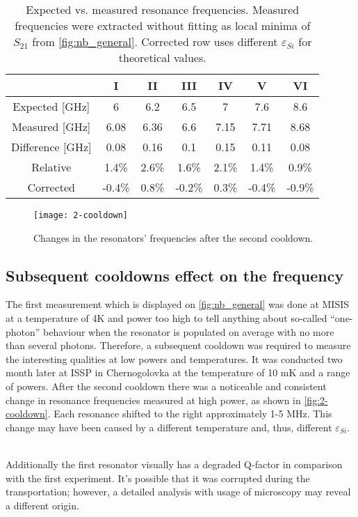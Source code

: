 \documentclass[12pt]{article}
\numberwithin{equation}{section}
\numberwithin{figure}{section}
\begin{document}
\begin{table}
\centering
\bgroup
\def\arraystretch{1.5}%
\begin{tabular}{c|*{6}{c}}
  & I & II & III & IV & V & VI\\
\hline
Expected [GHz]& 6 & 6.2 & 6.5 & 7 & 7.6 & 8.6 \\
Measured [GHz] & 6.08 &  6.36 &  6.6  &  7.15 &  7.71 &  8.68 \\
Difference [GHz]&  0.08 &  0.16 &  0.1  &  0.15 &  0.11 &  0.08 \\
Relative & 1.4\% &  2.6\% &  1.6\% &  2.1\% &  1.4\% &  0.9\% \\
Corrected & -0.4\% &  0.8\% & -0.2\% &  0.3\% & -0.4\% & -0.9\%
\end{tabular}
\egroup
\caption{Expected vs. measured resonance frequencies. Measured frequencies were extracted without fitting as local minima of $S_{21}$ from \autoref{fig:nb_general}. Corrected row uses different $\varepsilon_{Si}$ for theoretical values.}
\label{tab:freqs_nb}
\end{table}

\begin{figure}[h]
\centering
\texttt{[image: 2-cooldown]}
\caption{Changes in the resonators' frequencies after the second cooldown.}
\label{fig:2-cooldown}
\end{figure}

\subsection{Subsequent cooldowns effect on the frequency}

The first measurement which is displayed on \autoref{fig:nb_general} was done at MISIS at a temperature  of 4K and power too high to tell anything about so-called ``one-photon'' behaviour when the resonator is populated on average with no more than several photons. Therefore, a subsequent cooldown was required to measure the interesting qualities at low powers and temperatures. It was conducted two month later at ISSP in Chernogolovka at the temperature of 10 mK and a range of powers. After the second cooldown there was a noticeable and consistent change in resonance frequencies measured at high power, as shown in \autoref{fig:2-cooldown}. Each resonance shifted to the right approximately 1-5 MHz. This change may have been caused by a different temperature and, thus, different $\varepsilon_{Si}$. \

Additionally the first resonator visually has a degraded Q-factor in comparison with the first experiment. It's possible that it was corrupted during the transportation; however, a detailed analysis with usage of microscopy may reveal a different origin.
\end{document}
